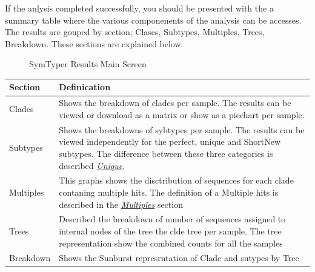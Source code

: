 \documentclass[letterpaper,10pt,english]{sphinxmanual}
\begin{document}
If the anlysis completed successfully, you should be presented with
the a summary table where the various componenents of the analysis
can be accesses. The results are gouped by section; Clases, Subtypes, Multiples, Trees, Breakdown. These sections are explained below.
\begin{figure}[htbp]
\centering
\capstart

\caption{SymTyper Results Main Screen}\label{Web:main-results-page}\end{figure}

\begin{tabulary}{\linewidth}{|L|L|}
\hline
\textsf{\relax 
Section
} & \textsf{\relax 
Definication
}\\
\hline
Clades
 & 
Shows the breakdown of clades per sample. The results can be viewed or download as a matrix or show as a piechart per sample.
\\

Subtypes
 & 
Shows the breakdowns of sybtypes per sample. The results can be viewed independently for the perfect, unique and  ShortNew subtypes.
The difference between these three categories is described  {\hyperref[defs:unique]{\emph{Unique}}}.
\\

Multiples
 & 
This graphs shows the disctribution of sequences for each clade contaning multiple hits. The definition of a Multiple hits is described in the {\hyperref[defs:multiples]{\emph{Multiples}}} section
\\

Trees
 & 
Described the breakdown of number of sequences assigned to internal nodes of the tree the clde tree per sample. The tree representation show the combined counts for all
the samples
\\

Breakdown
 & 
Shows the Sunburst represrntation of Clade and sutypes by Tree
\\
\hline\end{tabulary}
\end{document}
